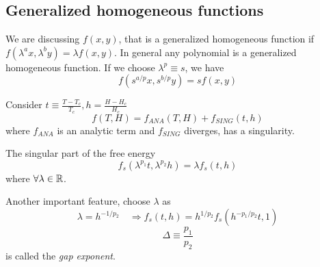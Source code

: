 \documentclass[../main/main.tex]{subfiles}
\begin{document}
\subsection{Generalized homogeneous functions}
We are discussing \( f(x,y) \), that is a generalized homogeneous function if \( f (\lambda ^a x, \lambda ^b y) = \lambda f(x,y)\). In general any polynomial is a generalized homogeneous function.
If we choose \( \lambda ^p \equiv s \), we have
\begin{equation}
  f ( s^{a/p} x, s^{b/p} y) = s f(x,y)
\end{equation}

Consider \( t \equiv  \frac{T - T_c}{T_c}, h = \frac{H - H_c}{H_c} \)
\begin{equation}
  f (T,H) = f_{ANA} (T,H) + f_{SING} (t,h)
\end{equation}
where \( f_{ANA} \) is an analytic term and \( f_{SING} \) diverges, has a singularity.

The singular part of the free energy
\begin{equation}
  f_s ( \lambda ^{p_1} t, \lambda ^{p_2} h) = \lambda f_s (t,h)
\end{equation}
where \( \forall \lambda \in \mathbb{R} \).

Another important feature, choose \( \lambda  \) as
\begin{equation}
  \lambda = h^{-1/p_2} \quad \Rightarrow f_s (t,h) = h^{1/p_2} f_s (h^{-p_1/p_2} t , 1)
\end{equation}
\begin{equation}
  \Delta  \equiv \frac{p_1}{p_2}
\end{equation}
is called the \emph{gap exponent}.
\end{document}
